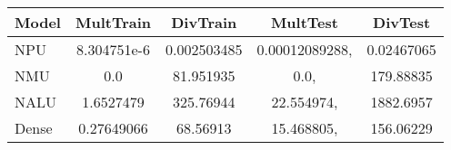 \begin{tabular}{lcccc}
\toprule
Model & MultTrain & DivTrain & MultTest & DivTest\\
\midrule
NPU & 8.304751e-6 & 0.002503485 & 0.00012089288, & 0.02467065 \\
NMU & 0.0 & 81.951935 & 0.0, & 179.88835 \\
NALU & 1.6527479 & 325.76944 & 22.554974, & 1882.6957 \\
Dense & 0.27649066 & 68.56913 & 15.468805, & 156.06229 \\
\bottomrule
\end{tabular}
